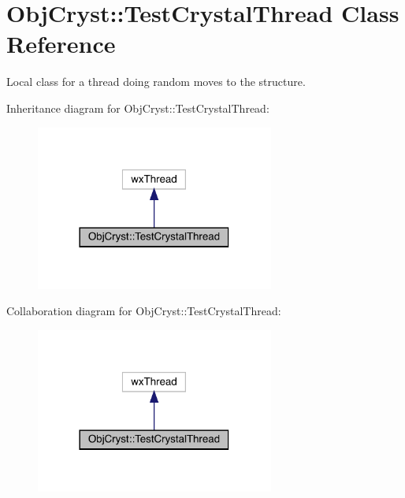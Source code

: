 \hypertarget{class_obj_cryst_1_1_test_crystal_thread}{}\section{Obj\+Cryst\+::Test\+Crystal\+Thread Class Reference}
\label{class_obj_cryst_1_1_test_crystal_thread}


Local class for a thread doing random moves to the structure.  




Inheritance diagram for Obj\+Cryst\+::Test\+Crystal\+Thread\+:
\nopagebreak
\begin{figure}[H]
\begin{center}
\leavevmode
\includegraphics[width=222pt]{class_obj_cryst_1_1_test_crystal_thread__inherit__graph}
\end{center}
\end{figure}


Collaboration diagram for Obj\+Cryst\+::Test\+Crystal\+Thread\+:
\nopagebreak
\begin{figure}[H]
\begin{center}
\leavevmode
\includegraphics[width=222pt]{class_obj_cryst_1_1_test_crystal_thread__coll__graph}
\end{center}
\end{figure}
